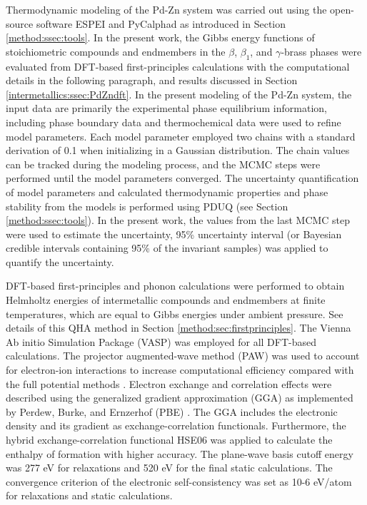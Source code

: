 Thermodynamic modeling of the Pd-Zn system was carried out using the open-source software ESPEI \cite{bocklund2019espei} and PyCalphad \cite{otis2017pycalphad} as introduced in Section \ref{method:ssec:tools}.  In the present work, the Gibbs energy functions of stoichiometric compounds and endmembers in the $\beta$, $\beta_1$, and $\gamma$-brass phases were evaluated from DFT-based first-principles calculations with the computational details in the following paragraph, and results discussed in Section \ref{intermetallics:ssec:PdZndft}. In the present modeling of the Pd-Zn system, the input data are primarily the experimental phase equilibrium information, including phase boundary data \cite{vizdal2006experimental, massalski1986binary, hansen1958constitution} and thermochemical data \cite{amore2009thermochemistry, ChiangIpserChang1977} were used to refine model parameters. Each model parameter employed two chains with a standard derivation of 0.1 when initializing in a Gaussian distribution. The chain values can be tracked during the modeling process, and the MCMC steps were performed until the model parameters converged. The uncertainty quantification of model parameters and calculated thermodynamic properties and phase stability from the models is performed using PDUQ \cite{paulson2019quantified} (see Section \ref{method:ssec:tools}). In the present work, the values from the last MCMC step were used to estimate the uncertainty, 95\% uncertainty interval (or Bayesian credible intervals containing 95\% of the invariant samples) was applied to quantify the uncertainty. 

DFT-based first-principles and phonon calculations were performed to obtain Helmholtz energies of intermetallic compounds and endmembers at finite temperatures, which are equal to Gibbs energies under ambient pressure. See details of this QHA method in Section \ref{method:sec:firstprinciples}. The Vienna Ab initio Simulation Package (VASP) \cite{kresse1996efficient} was employed for all DFT-based calculations. The projector augmented-wave method (PAW) was used to account for electron-ion interactions to increase computational efficiency compared with the full potential methods \cite{blochl1994projector, kresse1999ultrasoft}. Electron exchange and correlation effects were described using the generalized gradient approximation (GGA) as implemented by Perdew, Burke, and Ernzerhof (PBE) \cite{perdew1996generalized}. The GGA includes the electronic density and its gradient as exchange-correlation functionals. Furthermore, the hybrid exchange-correlation functional HSE06 \cite{heyd2003hybrid} was applied to calculate the enthalpy of formation with higher accuracy. The plane-wave basis cutoff energy was 277 eV for relaxations and 520 eV for the final static calculations. The convergence criterion of the electronic self-consistency was set as 10-6 eV/atom for relaxations and static calculations. 

